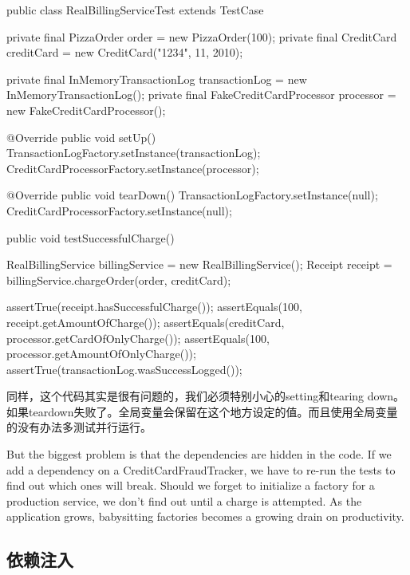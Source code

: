 \begin{Java}[单元测试]
public class RealBillingServiceTest extends TestCase {

  private final PizzaOrder order = new PizzaOrder(100);
  private final CreditCard creditCard = new CreditCard("1234", 11, 2010);

  private final InMemoryTransactionLog transactionLog = new InMemoryTransactionLog();
  private final FakeCreditCardProcessor processor = new FakeCreditCardProcessor();

  @Override public void setUp() {
    TransactionLogFactory.setInstance(transactionLog);
    CreditCardProcessorFactory.setInstance(processor);
  }

  @Override public void tearDown() {
    TransactionLogFactory.setInstance(null);
    CreditCardProcessorFactory.setInstance(null);
  }

  public void testSuccessfulCharge() {
    RealBillingService billingService = new RealBillingService();
    Receipt receipt = billingService.chargeOrder(order, creditCard);

    assertTrue(receipt.hasSuccessfulCharge());
    assertEquals(100, receipt.getAmountOfCharge());
    assertEquals(creditCard, processor.getCardOfOnlyCharge());
    assertEquals(100, processor.getAmountOfOnlyCharge());
    assertTrue(transactionLog.wasSuccessLogged());
  }
}
\end{Java}

同样，这个代码其实是很有问题的，我们必须特别小心的setting和tearing down。如果teardown失败了。全局变量会保留在这个地方设定的值。而且使用全局变量的没有办法多测试并行运行。

But the biggest problem is that the dependencies are hidden in the code. If we add a dependency on a CreditCardFraudTracker, we have to re-run the tests to find out which ones will break. Should we forget to initialize a factory for a production service, we don't find out until a charge is attempted. As the application grows, babysitting factories becomes a growing drain on productivity.


\subsection{依赖注入}

